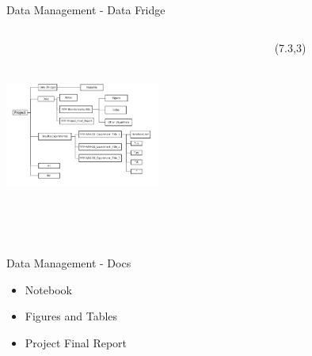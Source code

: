 \documentclass{beamer}
\begin{document}
\begin{frame}{Data Management - Data Fridge}

\begin{columns}[t] %
     \begin{column}[T]{4cm}
     \includegraphics[width=2in, height=2.5in]{structure.png}
     \end{column}
     \begin{column}{6cm}
     
    	\begin{textblock}{8}(7.3,3)
	\end{textblock}
              
     \end{column}
     \end{columns}
     
\end{frame}

\begin{frame}{Data Management - Docs}
	\begin{itemize}
\item\LARGE{Notebook}
\item{Figures and Tables}
\item{Project Final Report}
	\end{itemize}
\end{frame}
\end{document}
